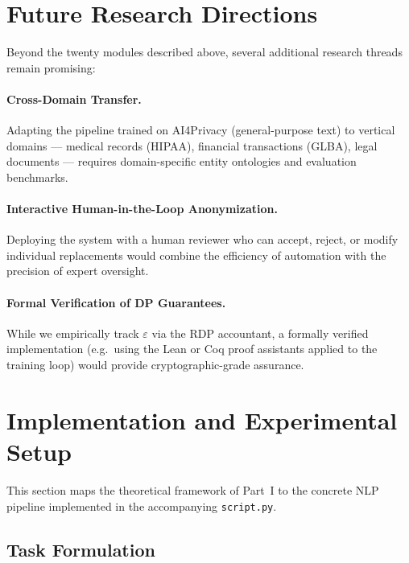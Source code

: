 \documentclass[11pt, a4paper]{article}
\begin{document}
\section{Future Research Directions}
\label{sec:future}

Beyond the twenty modules described above, several additional research
threads remain promising:

\paragraph{Cross-Domain Transfer.}
Adapting the pipeline trained on AI4Privacy (general-purpose text) to
vertical domains --- medical records (HIPAA), financial transactions
(GLBA), legal documents --- requires domain-specific entity ontologies
and evaluation benchmarks.

\paragraph{Interactive Human-in-the-Loop Anonymization.}
Deploying the system with a human reviewer who can accept, reject, or
modify individual replacements would combine the efficiency of
automation with the precision of expert oversight.

\paragraph{Formal Verification of DP Guarantees.}
While we empirically track $\varepsilon$ via the RDP accountant, a
formally verified implementation (e.g.\ using the Lean or Coq proof
assistants applied to the training loop) would provide
cryptographic-grade assurance.


\section{Implementation and Experimental Setup}
\label{sec:implementation}

This section maps the theoretical framework of Part~I to the concrete
NLP pipeline implemented in the accompanying \texttt{script.py}.

\subsection{Task Formulation}
\end{document}

